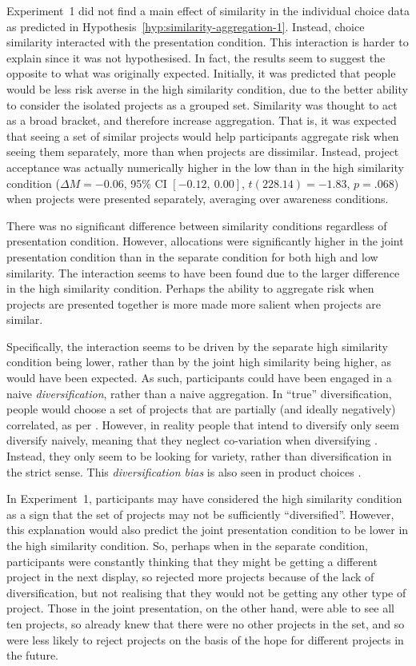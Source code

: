 \documentclass[a4paper, nobind]{templates/ociamthesis}
\theoremstyle{definition}
\theoremstyle{definition}
\theoremstyle{definition}
\theoremstyle{definition}
\theoremstyle{remark}
\begin{document}
Experiment~1 did not find a main effect of similarity in the individual choice
data as predicted in Hypothesis~\ref{hyp:similarity-aggregation-1}. Instead,
choice similarity interacted with the presentation condition. This interaction
is harder to explain since it was not hypothesised. In fact, the results seem to
suggest the opposite to what was originally expected. Initially, it was
predicted that people would be less risk averse in the high similarity
condition, due to the better ability to consider the isolated projects as a
grouped set. Similarity was thought to act as a broad bracket, and therefore
increase aggregation. That is, it was expected that seeing a set of similar
projects would help participants aggregate risk when seeing them separately,
more than when projects are dissimilar. Instead, project acceptance was actually
numerically higher in the low than in the high similarity condition
(\(\Delta M = -0.06\), 95\% CI \([-0.12,~0.00]\), \(t(228.14) = -1.83\), \(p = .068\)) when projects were
presented separately, averaging over awareness conditions.

There was no significant difference between similarity conditions regardless of
presentation condition. However, allocations were significantly higher in the
joint presentation condition than in the separate condition for both high and
low similarity. The interaction seems to have been found due to the larger
difference in the high similarity condition. Perhaps the ability to aggregate
risk when projects are presented together is more made more salient when
projects are similar.

Specifically, the interaction seems to be driven by the separate high similarity
condition being lower, rather than by the joint high similarity being higher, as
would have been expected. As such, participants could have been engaged in a
naive \emph{diversification}, rather than a naive aggregation. In ``true''
diversification, people would choose a set of projects that are partially (and
ideally negatively) correlated, as per \textcite{markowitz1952}. However, in reality
people that intend to diversify only seem diversify naively, meaning that they
neglect co-variation when diversifying \autocite[e.g.,][]{hedesstrom2006}. Instead, they
only seem to be looking for variety, rather than diversification in the strict
sense. This \emph{diversification bias} is also seen in product choices \autocite{read1995}.

In Experiment~1, participants may have considered the high similarity condition
as a sign that the set of projects may not be sufficiently ``diversified''.
However, this explanation would also predict the joint presentation condition to
be lower in the high similarity condition. So, perhaps when in the separate
condition, participants were constantly thinking that they might be getting a
different project in the next display, so rejected more projects because of the
lack of diversification, but not realising that they would not be getting any
other type of project. Those in the joint presentation, on the other hand, were
able to see all ten projects, so already knew that there were no other projects
in the set, and so were less likely to reject projects on the basis of the hope
for different projects in the future.
\end{document}
